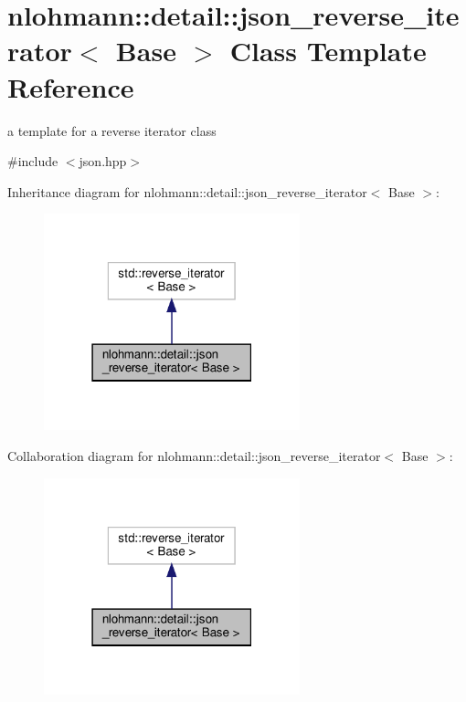 \hypertarget{classnlohmann_1_1detail_1_1json__reverse__iterator}{}\section{nlohmann\+:\+:detail\+:\+:json\+\_\+reverse\+\_\+iterator$<$ Base $>$ Class Template Reference}
\label{classnlohmann_1_1detail_1_1json__reverse__iterator}


a template for a reverse iterator class  




{\ttfamily \#include $<$json.\+hpp$>$}



Inheritance diagram for nlohmann\+:\+:detail\+:\+:json\+\_\+reverse\+\_\+iterator$<$ Base $>$\+:
\nopagebreak
\begin{figure}[H]
\begin{center}
\leavevmode
\includegraphics[width=210pt]{classnlohmann_1_1detail_1_1json__reverse__iterator__inherit__graph}
\end{center}
\end{figure}


Collaboration diagram for nlohmann\+:\+:detail\+:\+:json\+\_\+reverse\+\_\+iterator$<$ Base $>$\+:
\nopagebreak
\begin{figure}[H]
\begin{center}
\leavevmode
\includegraphics[width=210pt]{classnlohmann_1_1detail_1_1json__reverse__iterator__coll__graph}
\end{center}
\end{figure}
